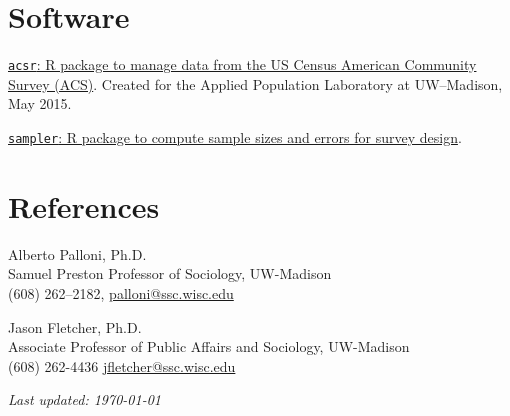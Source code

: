 \documentclass[10pt,letterpaper]{article}
\renewenvironment{itemize}{
  \begin{list}{}{
    \setlength{\leftmargin}{1.5em}
    \setlength{\itemsep}{0.25em}
    \setlength{\parskip}{0pt}
    \setlength{\parsep}{0.25em}
  }
}{
  \end{list}
}
\begin{document}
\section*{Software}

\begin{itemize}
\item \href{https://github.com/sdaza/acsr}{\texttt{acsr}: R package to manage data from the US Census American Community Survey (ACS)}. Created for the Applied Population Laboratory at UW--Madison, May 2015.
\item \href{https://github.com/sdaza/sampler}{\texttt{sampler}: R package to compute sample sizes and errors for survey design}.
\end{itemize}

\section*{References}

\begin{itemize}
\item Alberto Palloni, Ph.D.\\
Samuel Preston Professor of Sociology, UW-Madison\\
(608) 262--2182, \href{mailto:palloni@ssc.wisc.edu}{palloni@ssc.wisc.edu}

\item Jason Fletcher, Ph.D.\\
Associate Professor of Public Affairs and Sociology, UW-Madison\\
(608) 262-4436 \href{mailto:jfletcher@ssc.wisc.edu}{jfletcher@ssc.wisc.edu}
\end{itemize}



\bigskip
\bigskip
\begin{center}
  \begin{small}
    \textit{Last updated: \today}
  \end{small}
\end{center}

\end{document}
